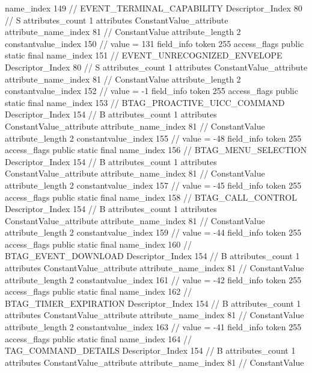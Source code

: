 {{{{{				name_index	149		// EVENT_TERMINAL_CAPABILITY
				Descriptor_Index	80		// S
				attributes_count	1
				attributes {
				ConstantValue_attribute {
					attribute_name_index	81		// ConstantValue
					attribute_length	2
					constantvalue_index	150		// value = 131
				}
				}
			}
			field_info {
				token	255
				access_flags	public static final
				name_index	151		// EVENT_UNRECOGNIZED_ENVELOPE
				Descriptor_Index	80		// S
				attributes_count	1
				attributes {
				ConstantValue_attribute {
					attribute_name_index	81		// ConstantValue
					attribute_length	2
					constantvalue_index	152		// value = -1
				}
				}
			}
			field_info {
				token	255
				access_flags	public static final
				name_index	153		// BTAG_PROACTIVE_UICC_COMMAND
				Descriptor_Index	154		// B
				attributes_count	1
				attributes {
				ConstantValue_attribute {
					attribute_name_index	81		// ConstantValue
					attribute_length	2
					constantvalue_index	155		// value = -48
				}
				}
			}
			field_info {
				token	255
				access_flags	public static final
				name_index	156		// BTAG_MENU_SELECTION
				Descriptor_Index	154		// B
				attributes_count	1
				attributes {
				ConstantValue_attribute {
					attribute_name_index	81		// ConstantValue
					attribute_length	2
					constantvalue_index	157		// value = -45
				}
				}
			}
			field_info {
				token	255
				access_flags	public static final
				name_index	158		// BTAG_CALL_CONTROL
				Descriptor_Index	154		// B
				attributes_count	1
				attributes {
				ConstantValue_attribute {
					attribute_name_index	81		// ConstantValue
					attribute_length	2
					constantvalue_index	159		// value = -44
				}
				}
			}
			field_info {
				token	255
				access_flags	public static final
				name_index	160		// BTAG_EVENT_DOWNLOAD
				Descriptor_Index	154		// B
				attributes_count	1
				attributes {
				ConstantValue_attribute {
					attribute_name_index	81		// ConstantValue
					attribute_length	2
					constantvalue_index	161		// value = -42
				}
				}
			}
			field_info {
				token	255
				access_flags	public static final
				name_index	162		// BTAG_TIMER_EXPIRATION
				Descriptor_Index	154		// B
				attributes_count	1
				attributes {
				ConstantValue_attribute {
					attribute_name_index	81		// ConstantValue
					attribute_length	2
					constantvalue_index	163		// value = -41
				}
				}
			}
			field_info {
				token	255
				access_flags	public static final
				name_index	164		// TAG_COMMAND_DETAILS
				Descriptor_Index	154		// B
				attributes_count	1
				attributes {
				ConstantValue_attribute {
					attribute_name_index	81		// ConstantValue
}}}}}}}
